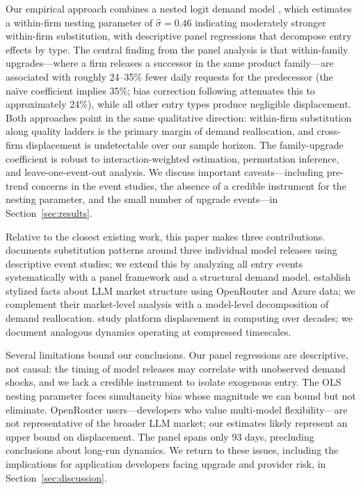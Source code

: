 \documentclass[11pt, a4paper]{article}
\begin{document}
Our empirical approach combines a nested logit demand model \citep{berry1994estimating, mcfadden1978modelling}, which estimates a within-firm nesting parameter of $\hat{\sigma} = 0.46$ indicating moderately stronger within-firm substitution, with descriptive panel regressions that decompose entry effects by type. The central finding from the panel analysis is that within-family upgrades---where a firm releases a successor in the same product family---are associated with roughly 24--35\% fewer daily requests for the predecessor (the na\"ive coefficient implies 35\%; bias correction following \citealt{roth2022pretest} attenuates this to approximately 24\%), while all other entry types produce negligible displacement. Both approaches point in the same qualitative direction: within-firm substitution along quality ladders is the primary margin of demand reallocation, and cross-firm displacement is undetectable over our sample horizon. The family-upgrade coefficient is robust to \citet{sunAbraham2021} interaction-weighted estimation, permutation inference, and leave-one-event-out analysis. We discuss important caveats---including pre-trend concerns in the event studies, the absence of a credible instrument for the nesting parameter, and the small number of upgrade events---in Section~\ref{sec:results}.

Relative to the closest existing work, this paper makes three contributions. \citet{fradkin2025demand} documents substitution patterns around three individual model releases using descriptive event studies; we extend this by analyzing all entry events systematically with a panel framework and a structural demand model. \citet{demirer2025emerging} establish stylized facts about LLM market structure using OpenRouter and Azure data; we complement their market-level analysis with a model-level decomposition of demand reallocation. \citet{bresnahan1999technological} study platform displacement in computing over decades; we document analogous dynamics operating at compressed timescales.

Several limitations bound our conclusions. Our panel regressions are descriptive, not causal: the timing of model releases may correlate with unobserved demand shocks, and we lack a credible instrument to isolate exogenous entry. The OLS nesting parameter faces simultaneity bias whose magnitude we can bound but not eliminate. OpenRouter users---developers who value multi-model flexibility---are not representative of the broader LLM market; our estimates likely represent an upper bound on displacement. The panel spans only 93 days, precluding conclusions about long-run dynamics. We return to these issues, including the implications for application developers facing upgrade and provider risk, in Section~\ref{sec:discussion}.
\end{document}

